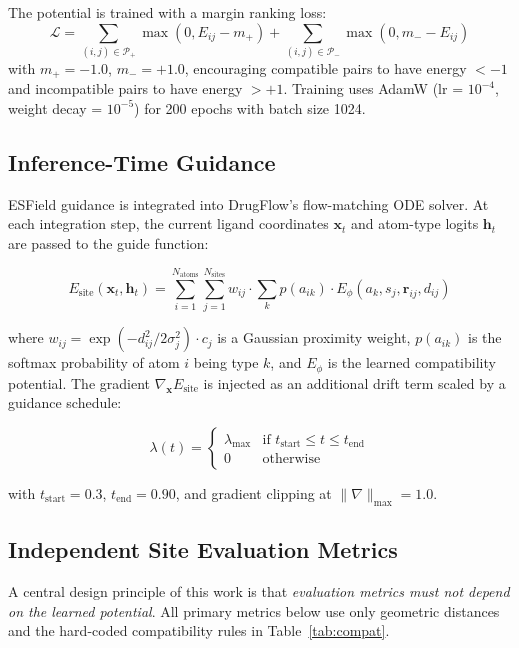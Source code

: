 \documentclass[journal=jcisd,manuscript=article]{achemso}
\begin{document}
The potential is trained with a margin ranking loss:
\begin{equation}
\mathcal{L} = \sum_{(i,j) \in \mathcal{P}_+} \max(0, E_{ij} - m_+)
            + \sum_{(i,j) \in \mathcal{P}_-} \max(0, m_- - E_{ij})
\end{equation}
with $m_+ = -1.0$, $m_- = +1.0$, encouraging compatible pairs to have
energy $< -1$ and incompatible pairs to have energy $> +1$. Training uses
AdamW (lr = $10^{-4}$, weight decay = $10^{-5}$) for 200 epochs with
batch size 1024.

\subsection{Inference-Time Guidance}

ESField guidance is integrated into DrugFlow's flow-matching ODE solver.
At each integration step, the current ligand coordinates $\mathbf{x}_t$ and
atom-type logits $\mathbf{h}_t$ are passed to the guide function:

\begin{equation}
E_{\text{site}}(\mathbf{x}_t, \mathbf{h}_t) = \sum_{i=1}^{N_{\text{atoms}}}
\sum_{j=1}^{N_{\text{sites}}}
w_{ij} \cdot \sum_{k} p(a_{ik}) \cdot E_\phi(a_k, s_j, \mathbf{r}_{ij}, d_{ij})
\end{equation}

where $w_{ij} = \exp(-d_{ij}^2 / 2\sigma_j^2) \cdot c_j$ is a Gaussian
proximity weight, $p(a_{ik})$ is the softmax probability of atom $i$ being
type $k$, and $E_\phi$ is the learned compatibility potential. The gradient
$\nabla_{\mathbf{x}} E_{\text{site}}$ is injected as an additional drift term
scaled by a guidance schedule:

\begin{equation}
\lambda(t) = \begin{cases}
\lambda_{\text{max}} & \text{if } t_{\text{start}} \leq t \leq t_{\text{end}} \\
0 & \text{otherwise}
\end{cases}
\end{equation}

with $t_{\text{start}} = 0.3$, $t_{\text{end}} = 0.90$, and gradient clipping
at $\|\nabla\|_{\text{max}} = 1.0$.

\subsection{Independent Site Evaluation Metrics}

A central design principle of this work is that \emph{evaluation metrics must
not depend on the learned potential}. All primary metrics below use only
geometric distances and the hard-coded compatibility rules in
Table~\ref{tab:compat}.
\end{document}
